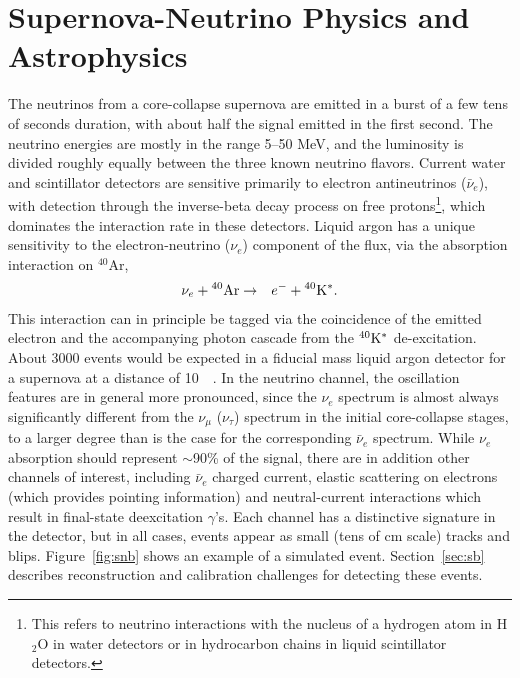 

\section{Supernova-Neutrino Physics and Astrophysics}

The neutrinos from a core-collapse supernova are emitted in a burst of
a few tens of seconds duration, with about half the signal emitted in the first
second. The neutrino energies are mostly in the range 5--50 MeV, and the
luminosity is divided roughly equally between the three known neutrino
flavors.  Current water and scintillator detectors are sensitive primarily to
electron antineutrinos ($\bar{\nu}_e$), with detection through the inverse-beta decay
process on free protons\footnote{This refers to neutrino interactions with the nucleus of a
hydrogen atom in H$_2$O in water detectors or in hydrocarbon chains in 
liquid scintillator detectors.},
 which dominates the interaction rate in these detectors.  Liquid argon has a unique sensitivity to
the electron-neutrino ($\nu_e$) component of the flux, via the absorption
interaction on $^{40}$Ar,
\begin{eqnarray*}
\nu_e +{}^{40}{\rm Ar} & \rightarrow & e^-+{}^{40}{\rm K^*}.
\end{eqnarray*} 
This interaction can in principle be tagged via the coincidence of the emitted
electron and the accompanying photon cascade from the $^{40}{\rm K^*}$
de-excitation.  About \num{3000} events would be expected in a 
fiducial mass liquid argon detector for a supernova at a distance of
\SI{10}{\kilo\parsec}.  In the neutrino channel, the oscillation
features are in general more pronounced, since the $\nu_e$ spectrum is almost
always significantly different from the $\nu_\mu$ ($\nu_\tau$) spectrum 
in the initial core-collapse stages, to a larger degree than is the
case for the corresponding $\bar{\nu}_e$ spectrum.  
While $\nu_e$ absorption should represent $\sim$90\% of the signal, there are in addition other channels of interest, including $\bar{\nu}_e$ charged current, elastic scattering on electrons (which provides pointing information) and neutral-current
interactions which result in final-state deexcitation $\gamma$'s. 
Each channel has a distinctive signature in the detector, but in all cases, events appear as small (tens of cm scale) tracks and blips.   Figure~\ref{fig:snb} shows an example of a simulated event.  Section~\ref{sec:sb} describes reconstruction and calibration challenges for detecting these events.



